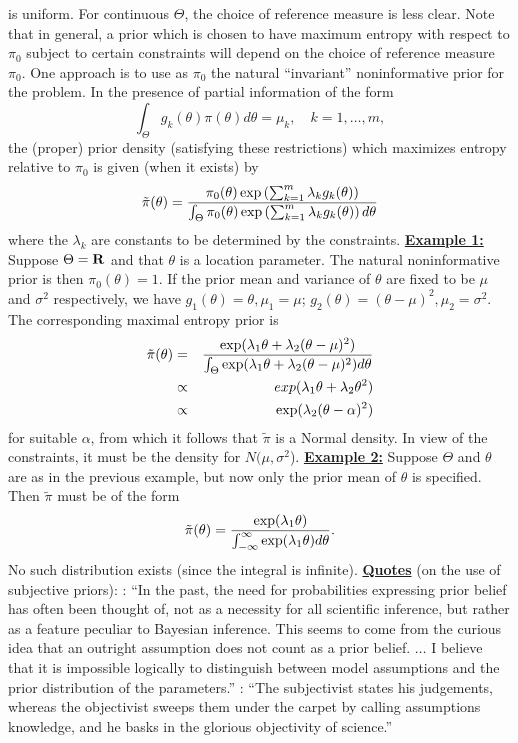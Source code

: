 \documentclass[12pt]{article}
\def\ni{\noindent}
\begin{document}
is uniform.  For continuous $\Theta$, the choice of reference measure
is less clear.  Note that in general, a prior which is chosen to have
maximum entropy with respect to $\pi_0$ subject to certain
constraints will depend on the choice of reference measure 
$\pi_0$.
\vskip 4mm
One approach is to use as $\pi_0$ the natural ``invariant''
noninformative prior for the problem.  In the presence of partial
information of the form
$$\int_{\Theta} g_k(\theta) \pi(\theta) d\theta = \mu_k, \quad k=1,
\ldots, m,$$
the (proper) prior density (satisfying these restrictions) which
maximizes entropy relative to $\pi_0$ is given (when it
exists) by
$$\tilde{\pi} (\theta)={\pi_0 (\theta) \exp \left( \sum_{k=1}^m
    \lambda_k g_k(\theta) \right) \over \int_{\Theta} \pi_0 (\theta)
  \exp \left( \sum_{k=1}^m \lambda_k g_k(\theta) \right) d\theta}$$
where the $\lambda_k$ are constants to be determined by the
constraints.
\vskip 4mm
\ni\underline{\bf Example 1:}~~  Suppose $\Theta={\bf R}$ and that $\theta$
is a location parameter.  The natural noninformative prior is then
$\pi_0 (\theta)=1$.  If the prior mean and variance of $\theta$ are
fixed to be $\mu$ and $\sigma^2$ respectively, we have
$g_1(\theta)=\theta,\mu_1=\mu$; $g_2(\theta)=(\theta-\mu)^2,
\mu_2=\sigma^2$.  The corresponding
maximal entropy prior is
\begin{eqnarray*}
\tilde{\pi} (\theta)&=&{\exp(\lambda_1 \theta + \lambda_2
  (\theta-\mu)^2) \over \int_\Theta \exp(\lambda_1 \theta + \lambda_2
  (\theta-\mu)^2) d\theta}\\
&\propto&\ exp(\lambda_1 \theta + \lambda_2 \theta^2) \\
&\propto& \exp(\lambda_2 (\theta-\alpha)^2)
\end{eqnarray*}
for suitable $\alpha$, from which it follows that $\tilde{\pi}$ is a Normal
density.  In view of the constraints, it must be the density for
$N(\mu,\sigma^2$).
\vskip 4mm
\ni\underline{\bf Example 2:}  Suppose $\Theta$ and $\theta$ are as in
the previous example, but now only the prior mean of $\theta$ is
specified.  Then $\tilde{\pi}$ must be of the form
$$\tilde{\pi} (\theta)={\exp(\lambda_1 \theta) \over
  \int_{-\infty}^\infty \exp (\lambda_1 \theta) d\theta}.$$
No such distribution exists (since the integral is infinite).
\vskip 12mm
\ni\underline{\bf Quotes} (on the use of subjective priors):
\vskip 4mm
\ni{\it George Box}: ``In the past, the need for probabilities expressing
prior belief has often been thought of, not as a necessity for all
scientific inference, but rather as a feature peculiar to Bayesian
inference.  This seems to come from the curious idea that an outright
assumption does not count as a prior belief.  $\ldots$ I believe that it is
impossible logically to distinguish between model assumptions and the
prior distribution of the parameters.''
\vskip 4mm
\ni{\it I.J.Good}: ``The subjectivist states his judgements, whereas the
objectivist sweeps them under the carpet by calling assumptions
knowledge, and he basks in the glorious objectivity of science.''
\vskip 6mm
\end{document}
